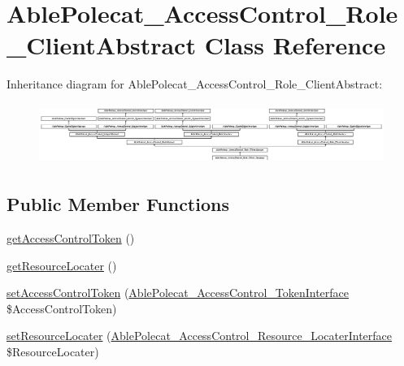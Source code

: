 \hypertarget{class_able_polecat___access_control___role___client_abstract}{}\section{Able\+Polecat\+\_\+\+Access\+Control\+\_\+\+Role\+\_\+\+Client\+Abstract Class Reference}
\label{class_able_polecat___access_control___role___client_abstract}
Inheritance diagram for Able\+Polecat\+\_\+\+Access\+Control\+\_\+\+Role\+\_\+\+Client\+Abstract\+:\begin{figure}[H]
\begin{center}
\leavevmode
\includegraphics[height=1.991870cm]{class_able_polecat___access_control___role___client_abstract}
\end{center}
\end{figure}
\subsection*{Public Member Functions}
\begin{DoxyCompactItemize}
\item 
\hyperlink{class_able_polecat___access_control___role___client_abstract_a47ac9d7ef686bd41f29563419360d10b}{get\+Access\+Control\+Token} ()
\item 
\hyperlink{class_able_polecat___access_control___role___client_abstract_a5016a8af80aa058cbfd360d00ebb6ce0}{get\+Resource\+Locater} ()
\item 
\hyperlink{class_able_polecat___access_control___role___client_abstract_a936fbc8779daa15334c3c23f9d0e79d6}{set\+Access\+Control\+Token} (\hyperlink{interface_able_polecat___access_control___token_interface}{Able\+Polecat\+\_\+\+Access\+Control\+\_\+\+Token\+Interface} \$Access\+Control\+Token)
\item 
\hyperlink{class_able_polecat___access_control___role___client_abstract_ac8f41684603c278abcc5055f8ffe0790}{set\+Resource\+Locater} (\hyperlink{interface_able_polecat___access_control___resource___locater_interface}{Able\+Polecat\+\_\+\+Access\+Control\+\_\+\+Resource\+\_\+\+Locater\+Interface} \$Resource\+Locater)
\end{DoxyCompactItemize}
